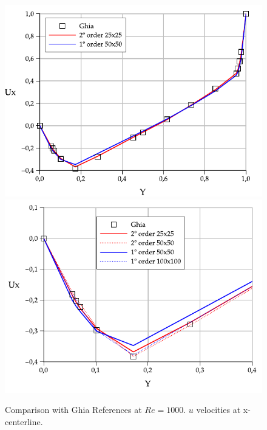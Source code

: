 \begin{figure}[htbp]
  \begin{center}
      \includegraphics[width=.85\linewidth]{../images/Re_1000_Ux.pdf}
      \includegraphics[width=.85\linewidth]{../images/Re_1000_Ux_zoom.pdf}
  \end{center}
  \caption{\label{fg:Re1000u} Comparison with Ghia References at $Re=1000$. $u$ velocities at x-centerline.}
\end{figure}

